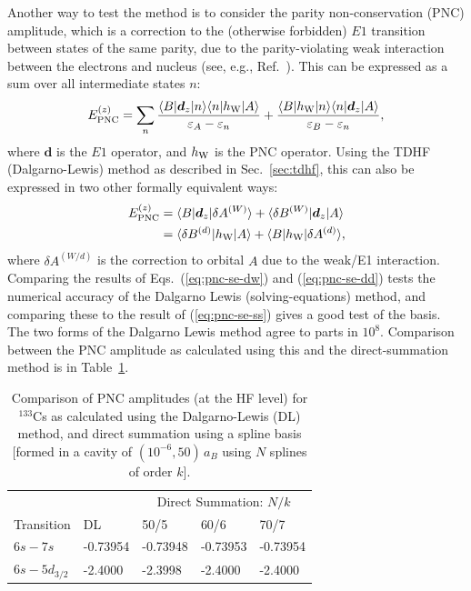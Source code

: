 \documentclass[10pt,twocolumn,a4paper]{article}%
\newcommand{\bra}[1]{\ensuremath{\langle #1|}}	%
\newcommand{\ket}[1]{\ensuremath{|#1\rangle}}	%
\renewcommand{\v}[1]{\ensuremath{\boldsymbol{#1}}}		%
\newcommand{\be}{\begin{equation}}
\newcommand{\ee}{\end{equation}}
\def\en{\ensuremath{\varepsilon}}
\begin{document}


Another way to test the method is to consider the parity non-conservation (PNC) amplitude, which is a correction to the (otherwise forbidden) $E1$ transition between states of the same parity, due to the parity-violating weak interaction between the electrons and nucleus (see, e.g., Ref.~\cite{GingesRev2004}).
This can be expressed as a sum over all intermediate states $n$:
\be
E_{{\rm PNC}}^{(z)} = \sum_n\frac{\bra{B}\v{d}_z\ket{n}\bra{n}h_{\rm W}\ket{A}}{\en_{A}-\en_n} + \frac{\bra{B}h_{\rm W}\ket{n}\bra{n}\v{d}_z\ket{A}}{\en_{B}-\en_n},
\label{eq:pnc-se-ss}
\ee
where $\v{d}$ is the $E1$ operator, and $h_{\rm W}$ is the PNC operator.
Using the TDHF (Dalgarno-Lewis) method as described in Sec.~\ref{sec:tdhf}, this can also be expressed in two other formally equivalent ways:
\begin{align}
E_{{\rm PNC}}^{(z)} &= \bra{B}\v{d}_z\ket{\delta A^{(W)}} + \bra{\delta B^{(W)}}\v{d}_z\ket{A} \label{eq:pnc-se-dw}\\
&= \bra{\delta B^{(d)}}h_{\rm W}\ket{A} +  \bra{B}h_{\rm W}\ket{\delta A^{(d)}}\label{eq:pnc-se-dd},
\end{align}
where $\delta A^{(W/d)}$ is the correction to orbital $A$ due to the weak/E1 interaction.
%
Comparing the results of Eqs.~(\ref{eq:pnc-se-dw}) and (\ref{eq:pnc-se-dd}) tests the numerical accuracy of the Dalgarno Lewis (solving-equations) method, and comparing these to the result of (\ref{eq:pnc-se-ss}) gives a good test of the basis.
The two forms of the Dalgarno Lewis method agree to parts in $10^8$.
Comparison between the PNC amplitude as calculated using this and the direct-summation method is in Table~\ref{tab:pnc-basis}.



\begin{table}%
\small
\centering
\caption{\small 
Comparison of PNC amplitudes (at the HF level) for $^{133}$Cs as calculated using the Dalgarno-Lewis (DL) method, and direct summation using a spline basis [formed in a cavity of $(10^{-6},50)\,a_B$ using $N$ splines  of order $k$].\label{tab:pnc-basis}}
\begin{tabular}{lllll}
\hline
\hline 
&&\multicolumn{3}{c}{Direct Summation: $N/k$}\\
\cline{3-5}
Transition&DL&50/5&60/6&70/7\\
\hline
$6s-7s$&-0.73954&-0.73948&-0.73953&-0.73954\\
$6s-5d_{3/2}$&-2.4000&-2.3998&-2.4000&-2.4000\\
\hline
\hline
\end{tabular}
\end{table}
\end{document}
